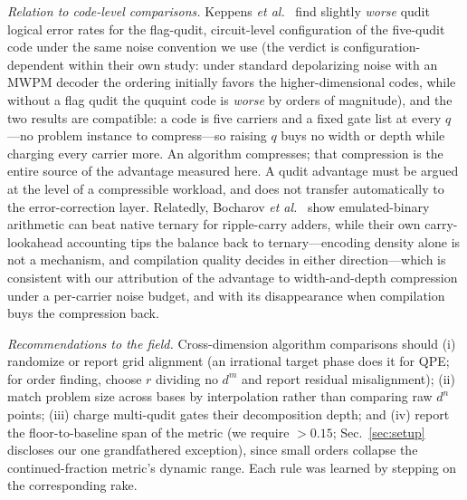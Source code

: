 \documentclass[aps,pra,reprint,superscriptaddress,nofootinbib,floatfix]{revtex4-2}
\begin{document}
\emph{Relation to code-level comparisons.} Keppens \emph{et
al.}~\cite{keppens2025} find slightly \emph{worse} qudit logical error
rates for the flag-qudit, circuit-level configuration of the
five-qudit code under the same noise convention we use (the verdict is
configuration-dependent within their own study: under standard
depolarizing noise with an MWPM decoder the ordering initially favors
the higher-dimensional codes, while without a flag qudit the ququint
code is \emph{worse} by orders of magnitude), and the two results are
compatible: a code is five carriers and a fixed gate list at
every $q$---no problem instance to compress---so raising $q$ buys no
width or depth while charging every carrier more. An algorithm
compresses; that compression is the entire source of the advantage
measured here. A qudit advantage must be argued at the level of a
compressible workload, and does not transfer automatically to the
error-correction layer. Relatedly, Bocharov \emph{et
al.}~\cite{bocharov2017} show emulated-binary arithmetic can beat native
ternary for ripple-carry adders, while their own carry-lookahead
accounting tips the balance back to ternary---encoding density alone
is not a mechanism, and compilation quality decides in either
direction---which is consistent with our attribution of the advantage
to width-and-depth compression under a per-carrier noise budget, and
with its disappearance when compilation buys the compression back.

\emph{Recommendations to the field.} Cross-dimension algorithm
comparisons should (i) randomize or report grid alignment (an
irrational target phase does it for QPE; for order finding, choose $r$
dividing no $d^m$ and report residual misalignment); (ii) match problem
size across bases by interpolation rather than comparing raw $d^n$
points; (iii) charge multi-qudit gates their decomposition depth; and
(iv) report the floor-to-baseline span of the metric (we require
${>}0.15$; Sec.~\ref{sec:setup} discloses our one grandfathered
exception), since small orders collapse the continued-fraction
metric's dynamic range. Each rule was learned by stepping on the
corresponding rake.
\end{document}
